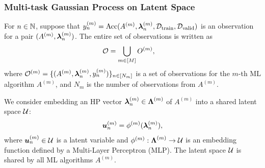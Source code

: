 \subsubsection{Multi-task Gaussian Process on Latent Space}
\label{sssec:MTGP}

For $n \in \mathbb{N}$, suppose that 
$y_n^{(m)} = \mathrm{Acc}(A^{(m)}, \boldsymbol{\lambda}_n^{(m)}, {\mathcal D}_{\mathrm{train}},{\mathcal D}_{\mathrm{valid}})$
is an observation for a pair $(A^{(m)}, \boldsymbol{\lambda}_n^{(m)})$.
%
The entire set of observations is written as 
\begin{align}
 {\mathcal O} &= \bigcup_{m \in [M]} O^{(m)}, 
 \label{eq:observed_data}
\end{align}
where 
${\mathcal O}^{(m)} = \{(A^{(m)}, \boldsymbol{\lambda}_n^{(m)}, y_n^{(m)}) \}_{n \in [N_m]}$
is a set of observations for the $m$-th ML algorithm $A^{(m)}$, and $N_m$ is the number of observations from $A^{(m)}$.


We consider embedding an HP vector
$\boldsymbol{\lambda}_n^{(m)} \in \boldsymbol{\Lambda}^{(m)}$
of
$A^{(m)}$
into a shared latent space ${\mathcal U}$:
\begin{align}
 \boldsymbol{u}_n^{(m)} = \phi^{(m)}(\boldsymbol{\lambda}_n^{(m)}), 
\end{align}
where 
$\boldsymbol{u}_n^{(m)} \in {\mathcal U}$
is a latent variable 
and
$\phi^{(m)}: \boldsymbol{\Lambda}^{(m)} \rightarrow {\mathcal U}$
is an embedding function defined by a Multi-Layer Perceptron (MLP).
The latent space ${\mathcal U}$ is shared by all ML algorithms $A^{(m)}$.


